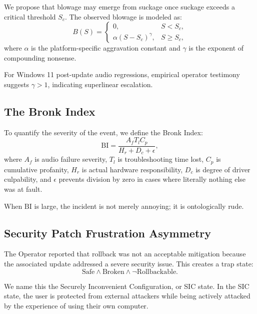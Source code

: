 \documentclass[10pt,twocolumn]{article}
\begin{document}
We propose that blowage may emerge from suckage once suckage exceeds a critical threshold $S_c$. The observed blowage is modeled as:
\begin{equation}
B(S) =
\begin{cases}
0, & S < S_c,\\
\alpha(S - S_c)^\gamma, & S \geq S_c,
\end{cases}
\label{eq:suck_blow}
\end{equation}
where $\alpha$ is the platform-specific aggravation constant and $\gamma$ is the exponent of compounding nonsense.

For Windows 11 post-update audio regressions, empirical operator testimony suggests $\gamma > 1$, indicating superlinear escalation.

\subsection{The Bronk Index}

To quantify the severity of the event, we define the Bronk Index:
\begin{equation}
\mathrm{BI} =
\frac{
A_f T_l C_p
}{
H_r + D_c + \epsilon
},
\label{eq:bronk}
\end{equation}
where $A_f$ is audio failure severity, $T_l$ is troubleshooting time lost, $C_p$ is cumulative profanity, $H_r$ is actual hardware responsibility, $D_c$ is degree of driver culpability, and $\epsilon$ prevents division by zero in cases where literally nothing else was at fault.

When $\mathrm{BI}$ is large, the incident is not merely annoying; it is ontologically rude.

\subsection{Security Patch Frustration Asymmetry}

The Operator reported that rollback was not an acceptable mitigation because the associated update addressed a severe security issue. This creates a trap state:
\begin{equation}
\mathrm{Safe} \land \mathrm{Broken} \land \neg \mathrm{Rollbackable}.
\label{eq:trap}
\end{equation}

We name this the Securely Inconvenient Configuration, or SIC state. In the SIC state, the user is protected from external attackers while being actively attacked by the experience of using their own computer.
\end{document}
